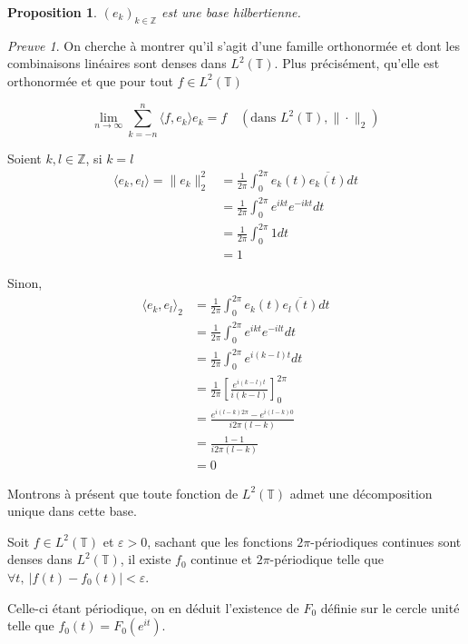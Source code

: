 \documentclass[]{article}
\newtheorem{myproposition}{Proposition}
\theoremstyle{remark}
\newtheorem{myproof}{Preuve}
\theoremstyle{definition}
\begin{document}
			\begin{myproposition}
				$ (e_k)_{k\in\mathbb{Z}} $ est une base hilbertienne.
			\end{myproposition}
			
			\begin{myproof}	
				On cherche à montrer qu'il s'agit d'une famille orthonormée et dont les combinaisons linéaires sont denses dans $L^2 (\mathbb{T})$. Plus précisément, qu'elle est orthonormée et que pour tout $f \in L^2(\mathbb{T})$
				
				$$\lim\limits_{n \to \infty} \sum_{k = -n}^n \langle f, e_k \rangle e_k = f \quad (\text{dans } L^2(\mathbb{T}), \|\cdot\|_2)$$
				
				Soient $k, l \in \mathbb{Z}$, si $k=l$
				\begin{align*}
					\langle e_k, e_l \rangle = \|e_k\|_2^2 &= \frac{1}{2\pi}\int_0^{2\pi} e_k(t)\overline{e_k(t)}dt\\
					&  =  \frac{1}{2\pi}\int_0^{2\pi} e^{ikt}e^{-ikt}dt\\
					& = \frac{1}{2\pi} \int_0^{2\pi} 1 dt\\
					& = 1
				\end{align*}
				 
			
				Sinon, 
				\begin{align*}
				\langle e_k, e_l\rangle_2 & = \frac{1}{2\pi} \int_0^{2\pi} e_k(t) \overline{e_l(t)}dt 
				\\ & = \frac{1}{2\pi} \int_0^{2\pi}e^{ik t} e^{-il t} dt 
				\\ & = \frac{1}{{2\pi}} \int_0^{2\pi} e^{i(k-l)t} dt 
				\\ & = \frac{1}{{2\pi}}  \left[ \frac {e^{i(k-l) t}} {{i(k-l)}} \right] _0^{2\pi}
				\\ & = \frac {e^{i (l-k){2\pi}} - e^{i(l-k)  0}} {i {2\pi}(l-k)}
				\\ & = \frac {1 - 1}{i {2\pi}(l-k)}\\
				&= 0
				\end{align*}

				Montrons à présent que toute fonction de $L^2(\mathbb{T}) $ admet une décomposition unique dans cette base.
				
				Soit $f \in L^2(\mathbb{T})$ et $\varepsilon > 0$, sachant que les fonctions $2\pi$-périodiques continues sont denses dans $L^2(\mathbb{T})$, il existe $f_0$ continue et $2\pi$-périodique telle que $\forall t, ~ | f(t) - f_0(t)| < \varepsilon$. 
				
				Celle-ci étant périodique, on en déduit l'existence de $F_0$ définie sur le cercle unité telle que $f_0(t) = F_0(e^{it})$.
				

\end{myproof}
\end{document}
